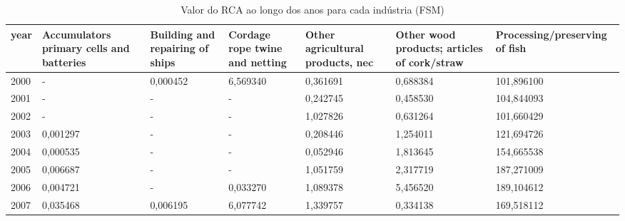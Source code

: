 \begin{table}
\centering
\caption{Valor do RCA ao longo dos anos para cada indústria (FSM)}
\begin{tabular}{p{1cm}p{2cm}p{2cm}p{2cm}p{2cm}p{2cm}p{2cm}}
\toprule
 year &  Accumulators primary cells and batteries &  Building and repairing of ships &  Cordage rope twine and netting &  Other agricultural products, nec &  Other wood products; articles of cork/straw &  Processing/preserving of fish \\
\midrule
 2000 &                                         - &                         0,000452 &                        6,569340 &                          0,361691 &                                     0,688384 &                     101,896100 \\
 2001 &                                         - &                                - &                               - &                          0,242745 &                                     0,458530 &                     104,844093 \\
 2002 &                                         - &                                - &                               - &                          1,027826 &                                     0,631264 &                     101,660429 \\
 2003 &                                  0,001297 &                                - &                               - &                          0,208446 &                                     1,254011 &                     121,694726 \\
 2004 &                                  0,000535 &                                - &                               - &                          0,052946 &                                     1,813645 &                     154,665538 \\
 2005 &                                  0,006687 &                                - &                               - &                          1,051759 &                                     2,317719 &                     187,271009 \\
 2006 &                                  0,004721 &                                - &                        0,033270 &                          1,089378 &                                     5,456520 &                     189,104612 \\
 2007 &                                  0,035468 &                         0,006195 &                        6,077742 &                          1,339757 &                                     0,334138 &                     169,518112 \\

\end{tabular}
\end{table}
